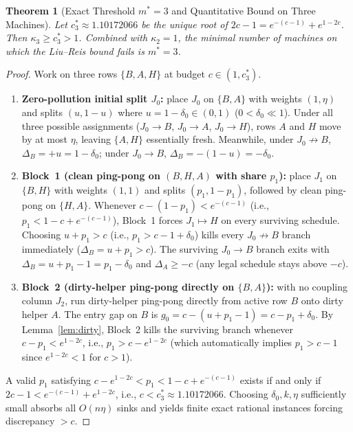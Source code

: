 \documentclass[11pt]{article}
\newtheorem{theorem}{Theorem}
\theoremstyle{definition}
\newcommand{\disc}{\Delta}
\begin{document}
\begin{theorem}[Exact Threshold $m^*=3$ and Quantitative Bound on Three Machines]\label{thm:m3}
Let $c_3^*\approx 1.10172066$ be the unique root of $2c-1=e^{-(c-1)}+e^{1-2c}$. Then $\kappa_3\ge c_3^*>1$. Combined with $\kappa_2=1$, the minimal number of machines on which the Liu--Reis bound fails is $m^*=3$.
\end{theorem}
\begin{proof}
Work on three rows $\{B,A,H\}$ at budget $c\in(1,c_3^*)$.
\begin{enumerate}
\item \textbf{Zero-pollution initial split $J_0$:} place $J_0$ on $\{B,A\}$ with weights $(1,\eta)$ and splits $(u,1-u)$ where $u=1-\delta_0\in(0,1)$ ($0<\delta_0\ll 1$). Under all three possible assignments ($J_0\to B$, $J_0\to A$, $J_0\to H$), rows $A$ and $H$ move by at most $\eta$, leaving $\{A,H\}$ essentially fresh. Meanwhile, under $J_0\not\to B$, $\disc_B=+u=1-\delta_0$; under $J_0\to B$, $\disc_B=-(1-u)=-\delta_0$.
\item \textbf{Block~1 (clean ping-pong on $(B,H,A)$ with share $p_1$):} place $J_1$ on $\{B,H\}$ with weights $(1,1)$ and splits $(p_1,1-p_1)$, followed by clean ping-pong on $\{H,A\}$. Whenever $c-(1-p_1)<e^{-(c-1)}$ (i.e., $p_1<1-c+e^{-(c-1)}$), Block~1 forces $J_1\mapsto H$ on every surviving schedule. Choosing $u+p_1>c$ (i.e., $p_1>c-1+\delta_0$) kills every $J_0\not\to B$ branch immediately ($\disc_B=u+p_1>c$). The surviving $J_0\to B$ branch exits with $\disc_B=u+p_1-1=p_1-\delta_0$ and $\disc_A\ge -c$ (any legal schedule stays above $-c$).
\item \textbf{Block~2 (dirty-helper ping-pong directly on $\{B,A\}$):} with no coupling column $J_2$, run dirty-helper ping-pong directly from active row $B$ onto dirty helper $A$. The entry gap on $B$ is $g_0=c-(u+p_1-1)=c-p_1+\delta_0$. By Lemma~\ref{lem:dirty}, Block~2 kills the surviving branch whenever $c-p_1<e^{1-2c}$, i.e., $p_1>c-e^{1-2c}$ (which automatically implies $p_1>c-1$ since $e^{1-2c}<1$ for $c>1$).
\end{enumerate}
A valid $p_1$ satisfying $c-e^{1-2c}<p_1<1-c+e^{-(c-1)}$ exists if and only if $2c-1<e^{-(c-1)}+e^{1-2c}$, i.e., $c<c_3^*\approx 1.10172066$. Choosing $\delta_0,k,\eta$ sufficiently small absorbs all $O(n\eta)$ sinks and yields finite exact rational instances forcing discrepancy $>c$.
\end{proof}
\end{document}
